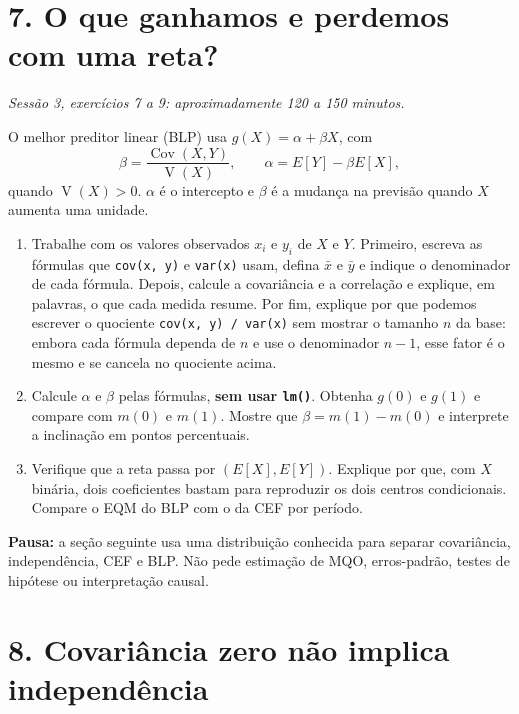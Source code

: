 \documentclass[
  brazilian,
  11pt,
  a4paper]{article}
\providecommand{\tightlist}{%
  \setlength{\itemsep}{0pt}\setlength{\parskip}{0pt}}
\begin{document}
\newpage

\section{7. O que ganhamos e perdemos com uma
reta?}\label{o-que-ganhamos-e-perdemos-com-uma-reta}

\emph{Sessão 3, exercícios 7 a 9: aproximadamente 120 a 150 minutos.}

O melhor preditor linear (BLP) usa \(g(X)=\alpha+\beta X\), com \[
\beta=\frac{\operatorname{Cov}(X,Y)}{\operatorname{V}(X)},
\qquad \alpha=E[Y]-\beta E[X],
\] quando \(\operatorname{V}(X)>0\). \(\alpha\) é o intercepto e
\(\beta\) é a mudança na previsão quando \(X\) aumenta uma unidade.

\begin{enumerate}
\def\labelenumi{\alph{enumi}.}
\tightlist
\item
  Trabalhe com os valores observados \(x_i\) e \(y_i\) de \(X\) e \(Y\).
  Primeiro, escreva as fórmulas que \texttt{cov(x,\ y)} e
  \texttt{var(x)} usam, defina \(\bar x\) e \(\bar y\) e indique o
  denominador de cada fórmula. Depois, calcule a covariância e a
  correlação e explique, em palavras, o que cada medida resume. Por fim,
  explique por que podemos escrever o quociente
  \texttt{cov(x,\ y)\ /\ var(x)} sem mostrar o tamanho \(n\) da base:
  embora cada fórmula dependa de \(n\) e use o denominador \(n-1\), esse
  fator é o mesmo e se cancela no quociente acima.
\item
  Calcule \(\alpha\) e \(\beta\) pelas fórmulas, \textbf{sem usar
  \texttt{lm()}}. Obtenha \(g(0)\) e \(g(1)\) e compare com \(m(0)\) e
  \(m(1)\). Mostre que \(\beta=m(1)-m(0)\) e interprete a inclinação em
  pontos percentuais.
\item
  Verifique que a reta passa por \((E[X],E[Y])\). Explique por que, com
  \(X\) binária, dois coeficientes bastam para reproduzir os dois
  centros condicionais. Compare o EQM do BLP com o da CEF por período.
\end{enumerate}

\textbf{Pausa:} a seção seguinte usa uma distribuição conhecida para
separar covariância, independência, CEF e BLP. Não pede estimação de
MQO, erros-padrão, testes de hipótese ou interpretação causal.

\newpage

\section{8. Covariância zero não implica
independência}\label{covariuxe2ncia-zero-nuxe3o-implica-independuxeancia}
\end{document}
